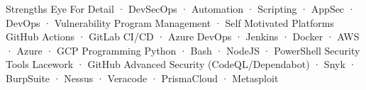 


\begin{cvaboutme}
    \cvabout
        {Strengths}
        {Eye For Detail · DevSecOps · Automation · Scripting · AppSec · DevOps · Vulnerability Program Management · Self Motivated}
    \cvabout
        {Platforms}
        {GitHub Actions · GitLab CI/CD · Azure DevOps · Jenkins · Docker · AWS · Azure · GCP}
    \cvabout
        {Programming}
        {Python · Bash · NodeJS · PowerShell}
    \cvabout
        {Security Tools}
        {Lacework · GitHub Advanced Security (CodeQL/Dependabot) · Snyk · BurpSuite · Nessus · Veracode · PrismaCloud · Metasploit}
\cvsubsection{}
\end{cvaboutme}